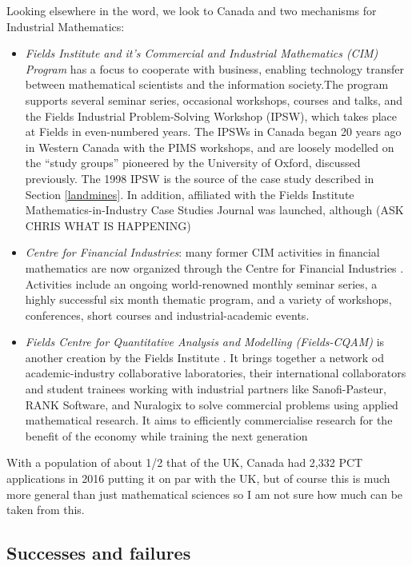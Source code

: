 \documentclass[11pt]{article} %
\begin{document}
	Looking elsewhere in the word, we look to Canada and two mechanisms for Industrial Mathematics: 
	

	\begin{itemize}
		\item \textit{Fields Institute and it's Commercial and Industrial Mathematics (CIM) Program} \cite{FieldsCIM}  has a focus to cooperate with business, enabling technology transfer between mathematical scientists and the information society.The program supports several seminar series, occasional workshops, courses and talks, and the Fields Industrial Problem-Solving Workshop (IPSW), which takes place at Fields in even-numbered years. The IPSWs in Canada began 20 years ago in Western Canada with the PIMS workshops, and are loosely modelled on the “study groups” pioneered by the University of Oxford, discussed previously. The 1998 IPSW is the source of the case study described in Section \ref{landmines}.
		 In addition, affiliated with  the Fields Institute Mathematics-in-Industry Case Studies Journal was launched, although (ASK CHRIS WHAT IS HAPPENING) 
		\item \textit{Centre for Financial Industries}: many former CIM activities in financial mathematics are now organized through the Centre for Financial Industries \cite{FieldsCFI}. Activities include an ongoing world-renowned monthly seminar series, a highly successful six month thematic program, and a variety of workshops, conferences, short courses and industrial-academic events. 
		\item \textit{Fields Centre for Quantitative Analysis and Modelling (Fields-CQAM)} is another creation by the Fields Institute \cite{CQAM}. It brings together a network od academic-industry collaborative laboratories, their international collaborators and  student trainees working   with industrial partners like Sanofi-Pasteur, RANK Software, and Nuralogix to solve commercial problems using applied mathematical research. It aims to efficiently commercialise research for the benefit of the economy while training the next generation 
	\end{itemize}
	

	
With a population of about 1/2 that of the UK, Canada had 2,332 PCT applications in 2016 \cite{WIPO} putting it on par with the UK, but of course this is much more general than just mathematical sciences so I am not sure how much can be taken from this. 

	\subsection{Successes and failures}
	
\end{document}
